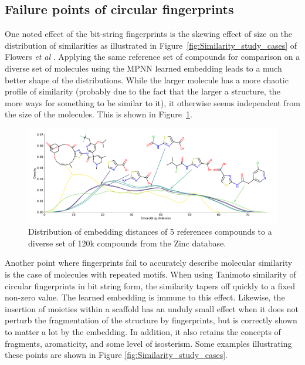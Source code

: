 \documentclass[journal=jacsat,manuscript=article]{achemso}
\begin{document}
\subsection{Failure points of circular fingerprints}
One noted effect of the bit-string fingerprints is the skewing effect of size on the distribution of similarities as illustrated in Figure~\ref{fig:Similarity_study_cases} of Flowers \textit{et al} \cite{flower1998properties}. Applying the same reference set of compounds for comparison on a diverse set of molecules using the MPNN learned embedding leads to a much better shape of the distributions. While the larger molecule has a more chaotic profile of similarity (probably due to the fact that the larger a structure, the more ways for something to be similar to it), it otherwise seems  independent from the size of the molecules. This is shown in Figure~\ref{fig:References_distributions}.


\begin{figure}[hbtp]
\centering
\includegraphics[width=\textwidth]{data/References_distributions.pdf}
\caption{Distribution of embedding distances of 5 references compounds to a diverse set of 120k compounds from the Zinc database.}
\label{fig:References_distributions}
\end{figure}


Another point where fingerprints fail to accurately describe molecular similarity is the case of molecules with repeated motifs. When using Tanimoto similarity of circular fingerprints in bit string form, the similarity tapers off quickly to a fixed non-zero value. The learned embedding is immune to this effect. Likewise, the insertion of moieties within a scaffold has an unduly small effect when it does not perturb the fragmentation of the structure by fingerprints, but is correctly shown to matter a lot by the embedding. In addition, it also retains the concepts of fragments, aromaticity, and some level of isosterism. Some examples illustrating these points are shown in Figure \ref{fig:Similarity_study_cases}.
\end{document}
